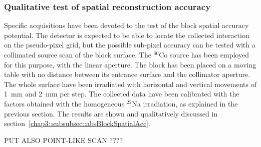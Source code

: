 \subsubsection{Qualitative test of spatial reconstruction accuracy}\label{chap3::subsubsec::test_spatial_scan}

Specific acquisitions have been devoted to the test of the block spatial accuracy potential. The detector is expected to be able to locate the collected interaction on the pseudo-pixel grid, but the possible sub-pixel accuracy can be tested with a collimated source scan of the block surface. The $^{60}$Co source has been employed for this purpose, with the linear aperture. The block has been placed on a moving table with no distance between its entrance surface and the collimator aperture. The whole surface have been irradiated with horizontal and vertical movements of 1~mm and 2~mm per step. The collected data have been calibrated with the factors obtained with the homogeneous $^{22}$Na irradiation, as explained in the previous section. The results are shown and qualitatively discussed in section~\ref{chap3::subsubsec::absBlockSpatialAcc}. 

PUT ALSO POINT-LIKE SCAN ????

